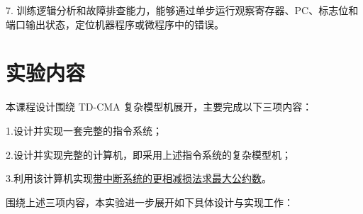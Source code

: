 \documentclass[UTF8,12pt,a4paper]{ctexart}
\begin{document}
7. 训练逻辑分析和故障排查能力，能够通过单步运行观察寄存器、PC、标志位和端口输出状态，定位机器程序或微程序中的错误。

\section{实验内容}

\vspace{0.3em}

本课程设计围绕 TD-CMA 复杂模型机展开，主要完成以下三项内容：

1.\quad 设计并实现一套完整的指令系统；

2.\quad 设计并实现完整的计算机，即采用上述指令系统的复杂模型机；

3.\quad 利用该计算机实现\underline{带中断系统的更相减损法求最大公约数}。

\vspace{0.8em}

围绕上述三项内容，本实验进一步展开如下具体设计与实现工作：
\end{document}
